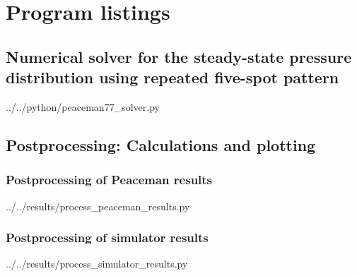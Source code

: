 \section{Program listings} %
\label{sec:program_listings}

\subsection{Numerical solver for the steady-state pressure distribution using repeated five-spot pattern} %
\label{sub:numerical_solver_for_the_steady_state_pressure_distribution_using_repeated_five_spot_pattern}


  {../../python/peaceman77_solver.py}

\clearpage
\subsection{Postprocessing: Calculations and plotting} %
\label{sub:postprocessing_calculations_and_plotting}

\subsubsection{Postprocessing of Peaceman results} %
\label{ssub:postprocessing_of_peaceman_results}

  {../../results/process_peaceman_results.py}

\subsubsection{Postprocessing of simulator results} %
\label{ssub:postprocessing_of_simulator_results}

  {../../results/process_simulator_results.py}



